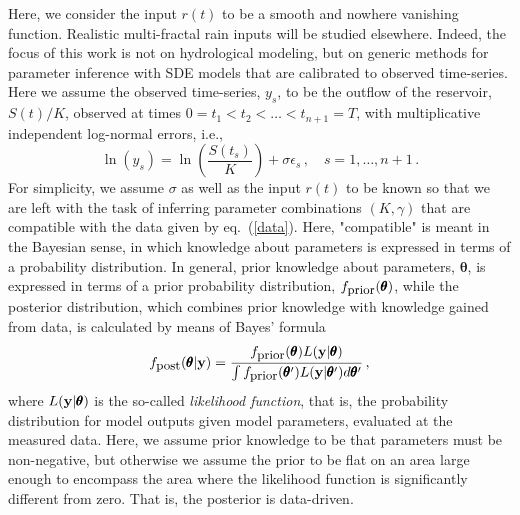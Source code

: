 \documentclass[12pt,a4paper,final]{iopart}
\newcommand{\bt}{\pmb\theta}
\newcommand{\vc}[1]{{\bf #1 }}
\begin{document}
Here, we consider the input $r(t)$ to be a smooth and nowhere vanishing function. Realistic multi-fractal rain inputs \cite{tessier_1996} will be studied elsewhere.
Indeed, the focus of this work is not on hydrological modeling, but on generic methods for parameter inference with SDE models that are calibrated to observed time-series.
Here we assume the observed time-series, $y_s$, to be the outflow of the reservoir, $S(t)/K$, observed at times $0=t_1<t_2<\dots < t_{n+1}=T$, with multiplicative independent log-normal errors, i.e.,
\begin{equation}\label{data}
  \ln \left( y_s \right)
  =
  \ln \left( \frac{S(t_s)}{K} \right)
  +
  \sigma\epsilon_s\,,\quad s=1,\dots,n+1\,.
\end{equation}
For simplicity, we assume $\sigma$ as well as the input $r(t)$ to be known so that we are left with the task of inferring parameter combinations $(K,\gamma)$ that are compatible with the data given by eq.~(\ref{data}).
Here, "compatible" is meant in the Bayesian sense, in which knowledge about parameters is expressed in terms of a probability distribution.
In general, prior knowledge about parameters, $\bt$, is expressed in terms of a prior probability distribution, $f_{\mbox{\small prior}}(\bt)$, while the posterior distribution, which combines prior knowledge with knowledge gained from data, is calculated by means of Bayes' formula
\begin{equation}\label{Bayes}
  f_{\mbox{\small post}}(\bt|\vc y)
  =
  \frac{f_{\mbox{\small prior}}(\bt)L(\vc y|\bt)}
  {\int f_{\mbox{\small prior}}(\bt')L(\vc y|\bt')d\bt'}\,,
\end{equation}
where $L(\vc y|\bt)$ is the so-called {\em likelihood function}, that is, the probability distribution for model outputs given model parameters, evaluated at the measured data.
Here, we assume prior knowledge to be that parameters must be non-negative, but otherwise we assume the prior to be flat on an area large enough to encompass the area where the likelihood function is significantly different from zero. That is, the posterior is data-driven.
\end{document}
